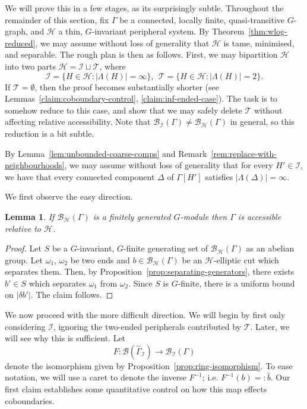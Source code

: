 \documentclass[11pt,a4paper]{amsart}
\newtheorem{lemma}[theorem]{Lemma}
\theoremstyle{definition}
\newcommand{\per}{\mathcal{H}}
\newcommand{\br}{{\mathscr{B}}}
\begin{document}
We will prove this in a few stages, as its surprisingly subtle. Throughout the remainder of this section, fix $\Gamma$ be a connected, locally finite, quasi-transitive $G$-graph, and $\per$ a thin, $G$-invariant peripheral system. 
By Theorem~\ref{thm:wlog-reduced}, we may assume without loss of generality that $\per$ is tame, minimised, and separable. The rough plan is then as follows. First, we may bipartition $\per$ into two parts $\per = \mathcal I \sqcup \mathcal T$, where
$$
\mathcal I = \{H \in \per : |\Lambda(H)| = \infty\}, \ \  \mathcal T = \{H \in \per : |\Lambda(H)| = 2\}.
$$
If $\mathcal T = \emptyset$, then the proof becomes substantially shorter (see Lemmas~\ref{claim:coboundary-control}, \ref{claim:inf-ended-case}). The task is to somehow reduce to this case, and show that we may safely delete $\mathcal T$ without affecting relative accessibility. Note that $\br_{\mathcal I}(\Gamma) \neq \br _\per(\Gamma)$ in general, so this reduction is a bit subtle. 

By Lemma~\ref{lem:unbounded-coarse-comps} and Remark~\ref{rem:replace-with-neighbourhoods}, we may assume without loss of generality that for every $H' \in \mathcal I$, we have that every connected component $\Delta$ of $\Gamma[H']$ satisfies $|\Lambda(\Delta)| = \infty$. 

We first observe the easy direction.

    \begin{lemma}\label{claim:easy-case}
        If $\br_\per(\Gamma)$ is a finitely generated $G$-module then $\Gamma$ is accessible relative to $\per$.
    \end{lemma}

    \begin{proof}
        Let $S$ be a $G$-invariant, $G$-finite generating set of  $\br_\per(\Gamma)$ as an abelian group. Let $\omega_1$, $\omega_2$ be two ends and $b \in \br_\per(\Gamma)$ be an $\per$-elliptic cut which separates them. Then, by Proposition~\ref{prop:separating-generators}, there exists $b' \in S$ which separates $\omega_1$ from $\omega_2$. Since $S$ is $G$-finite, there is a uniform bound on $|\delta b'|$. The claim follows. 
    \end{proof}

We now proceed with the more difficult direction. We will begin by first only considering $\mathcal I$, ignoring the two-ended peripherals contributed by $\mathcal T$. Later, we will see why this is sufficient. 
    Let 
    $$
    F : \br (\widehat \Gamma_{\mathcal I}) \to \br_{\mathcal I} (\Gamma)
    $$
    denote the isomorphism given by Proposition~\ref{prop:ring-isomorphism}. To ease notation, we will use a caret to denote the inverse $F^{-1}$; i.e. $F^{-1}(b) =: \widehat b$. Our first claim establishes some quantitative control on how this map effects coboundaries.
\end{document}
